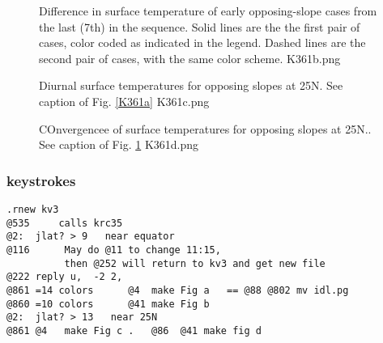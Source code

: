 \begin{figure}[!ht] 
\caption[Valley convergence]{Difference in surface temperature of early opposing-slope cases from the last (7th) in the sequence. Solid lines are the the first pair of cases, color coded as indicated in the legend. Dashed lines are the second pair of cases, with the same color scheme.
\label{K361b}  K361b.png }
\end{figure} 

\begin{figure}[!ht] 
\caption[Valley temperatures 25N]{Diurnal surface temperatures for opposing slopes at 25N. See caption of Fig.  \ref{K361a}
\label{K361c}  K361c.png  }
\end{figure} 

\begin{figure}[!ht] 
\caption[Valley convergence 25N]{COnvergencee of surface temperatures for opposing slopes at 25N.. See caption of Fig.  \ref{K361b}
\label{K361d}  K361d.png  }
\end{figure} 

\subsubsection{keystrokes} %
\vspace{-3.mm} 
\begin{verbatim}
.rnew kv3
@535     calls krc35
@2:  jlat? > 9   near equator
@116      May do @11 to change 11:15, 
          then @252 will return to kv3 and get new file   
@222 reply u,  -2 2, 
@861 =14 colors      @4  make Fig a   == @88 @802 mv idl.pg
@860 =10 colors      @41 make Fig b 
@2:  jlat? > 13   near 25N
@861 @4   make Fig c .   @86  @41 make fig d


\end{verbatim}  